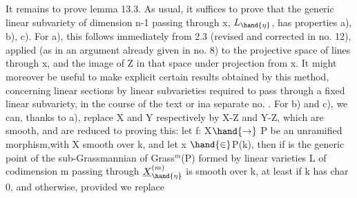 
It remains to prove lemma 13.3. As usual, it suffices to prove
that the generic linear subvariety of dimension n-1 passing through x,
$L_{\hand{\eta}}$, has properties a), b), c). For a),  this follows 
immediately from 2.3 (revised and corrected in no. 12), applied (as in an
argument already given in no. 8) to the projective space of lines
through x, and the image of Z in that space under projection from
x. \hand{[}It might moreover be useful to make explicit certain
 results obtained by this method, concerning linear sections
by linear subvarieties required to pass through a fixed linear
subvariety, in the course of the text or in\hand{/}a separate no. \hand{]}. For  b) and c),
 we can, thanks to a), replace X and Y respectively by X-Z and Y-Z,
which are smooth, and are reduced to proving this: let f: X$\hand{\rightarrow}$ P be an
unramified morphism,\hand{(}with X smooth over k, and let x $\hand{\in}$P(k), then if
\hand{$\eta$} is the generic point of  the sub-Grassmannian of Grass$^{m}$(P)
formed by linear varieties L of codimension m passing through  
  $\underline{X}^{(m)}_{\hand{\eta}}$ is smooth over k, at
 least if k has char 0, and otherwise, provided we replace
